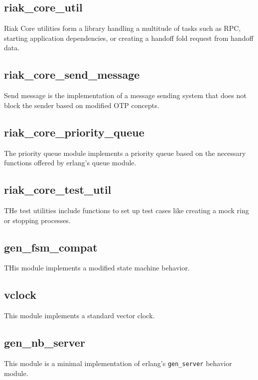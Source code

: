 	\subsection{riak\_core\_util}
		Riak Core utilities form a library handling a multitude of tasks such as  RPC, starting application dependencies, or creating a handoff fold request from handoff data.
	
	\subsection{riak\_core\_send\_message}
		Send message is the implementation of a message sending system that does not block the sender based on modified OTP concepts.
	
	\subsection{riak\_core\_priority\_queue}
		The priority queue module implements a priority queue based on the necessary functions offered by erlang's queue module.
	
	\subsection{riak\_core\_test\_util}
		THe test utilities include functions to set up test cases like creating a mock ring or stopping processes.
	
	\subsection{gen\_fsm\_compat}
		THis module implements a modified state machine behavior.
	
	\subsection{vclock}
		This module implements a standard vector clock.
	
	\subsection{gen\_nb\_server}
		This module is a minimal implementation of erlang's \lstinline!gen_server! behavior module.